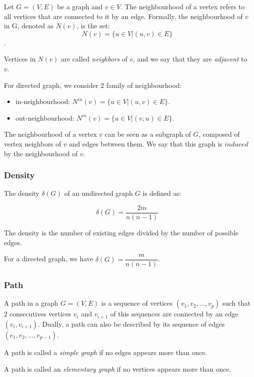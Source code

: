 \documentclass[table]{report}
\begin{document}
Let $G =(V,E)$ be a graph and $v \in V$. The neighbourhood of a vertex refers to all vertices that are connected to it by an edge. Formally, the neighbourhood of $v$ in G, denoted as $N(v)$, is the set: 
$$N(v) = \{u \in V | (u,v) \in E\}$$. 

Vertices in $N(v)$ are called \textit{neighbors} of $v$, and we say that they are \textit{adjacent} to $v$.


For directed graph, we consider 2 family of neighbourhood: 
\begin{itemize}[noitemsep]
    \item in-neighbourhood: $N^{in}(v) = \{u \in V | (u,v) \in E\}$. 

    \item out-neighbourhood: $N^{in}(v) = \{u \in V | (v,u) \in E\}$. 
\end{itemize}

The neighbourhood of a vertex $v$ can be seen as a subgraph of $G$, composed of vertex neighbors of $v$ and edges between them. We say that this graph is $induced$ by the neighbourhood of $v$. 


\subsubsection{Density}

The density $\delta(G)$ of an undirected graph $G$ is defined as:

$$\delta(G) = \dfrac{2m}{n(n-1)}$$ 

The density is the number of existing edges divided by the number of possible edges.

For a directed graph, we have $\delta(G) = \dfrac{m}{n(n-1)}$.

\subsubsection{Path}

A path in a graph $G = (V,E)$ is a sequence of vertices $(v_1, v_2,..., v_p)$ such that 2 consecutives vertices $v_i$ and $v_{i+1}$ of this sequences are connected by an edge $(v_i, v_{i+1})$. Dually, a path can also be described by its sequence of edges $(e_1, e_2,...,e_{p-1})$.

A path is called a \textit{simple graph} if no edges appears more than once. 

A path is called an \textit{elementary graph} if no vertices appears more than once. 
\end{document}
